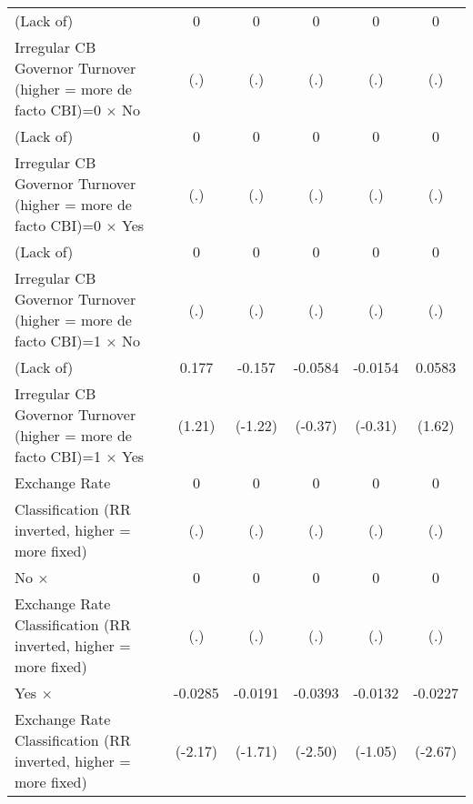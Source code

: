{\begin{tabular}{l*{5}{c}}
\addlinespace
(Lack of)       &        0         &        0         &        0         &        0         &        0         \\
Irregular CB Governor Turnover (higher = more de facto CBI)=0 $\times$ No&      (.)         &      (.)         &      (.)         &      (.)         &      (.)         \\
\addlinespace
(Lack of)       &        0         &        0         &        0         &        0         &        0         \\
Irregular CB Governor Turnover (higher = more de facto CBI)=0 $\times$ Yes&      (.)         &      (.)         &      (.)         &      (.)         &      (.)         \\
\addlinespace
(Lack of)       &        0         &        0         &        0         &        0         &        0         \\
Irregular CB Governor Turnover (higher = more de facto CBI)=1 $\times$ No&      (.)         &      (.)         &      (.)         &      (.)         &      (.)         \\
\addlinespace
(Lack of)       &    0.177         &   -0.157         &  -0.0584         &  -0.0154         &   0.0583         \\
Irregular CB Governor Turnover (higher = more de facto CBI)=1 $\times$ Yes&   (1.21)         &  (-1.22)         &  (-0.37)         &  (-0.31)         &   (1.62)         \\
\addlinespace
Exchange Rate   &        0         &        0         &        0         &        0         &        0         \\
Classification (RR inverted, higher = more fixed)&      (.)         &      (.)         &      (.)         &      (.)         &      (.)         \\
\addlinespace
No $\times$     &        0         &        0         &        0         &        0         &        0         \\
Exchange Rate Classification (RR inverted, higher = more fixed)&      (.)         &      (.)         &      (.)         &      (.)         &      (.)         \\
\addlinespace
Yes $\times$    &  -0.0285\sym{*}  &  -0.0191         &  -0.0393\sym{*}  &  -0.0132         &  -0.0227\sym{**} \\
Exchange Rate Classification (RR inverted, higher = more fixed)&  (-2.17)         &  (-1.71)         &  (-2.50)         &  (-1.05)         &  (-2.67)         \\

\end{tabular}}
